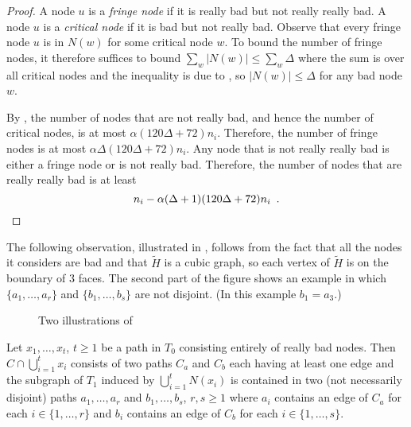 \documentclass{patmorin}
\begin{document}
\begin{proof}
    A node $u$ is a \emph{fringe node} if it is really bad but not really really bad. A node $u$ is a \emph{critical node} if it is bad but not really bad.  Observe that every fringe node $u$ is in $N(w)$ for some critical node $w$.  To bound the number of fringe nodes, it therefore suffices to bound $\sum_{w}|N(w)|\le\sum_{w}\Delta$ where the sum is over all critical nodes and the inequality is due to , so $|N(w)|\le\Delta$ for any bad node $w$.

    By , the number of nodes that are not really bad, and hence the number of critical nodes, is at most $\alpha(120\Delta+72) n_i$.  Therefore, the number of fringe nodes is at most $\alpha\Delta(120\Delta+72) n_i$.
    Any node that is not really really bad is either a fringe node or is not really bad.  Therefore, the number of nodes that are really really bad is at least
    \[
        n_i - \alpha(\Delta+1)(120\Delta+72) n_i \enspace . \qedhere
    \]
\end{proof}

The following observation, illustrated in , follows from the fact that all the nodes it considers are bad and that $\tilde{H}$ is a cubic graph, so each vertex of $\tilde{H}$ is on the boundary of 3 faces. The second part of the figure shows an example in which $\{a_1,\ldots,a_r\}$ and $\{b_1,\ldots,b_s\}$ are not disjoint. (In this example $b_1=a_3$.)

\begin{figure}
    \caption{Two illustrations of }
\end{figure}


\begin{obs}
    Let $x_1,\ldots,x_t$, $t\ge 1$ be a path in $T_0$ consisting entirely of really bad nodes.  Then $C\cap\bigcup_{i=1}^t x_i$ consists of two paths $C_a$ and $C_b$ each having at least one edge and the subgraph of $T_1$ induced by $\bigcup_{i=1}^t N(x_i)$ is contained in two (not necessarily disjoint) paths $a_1,\ldots,a_r$ and $b_1,\ldots,b_s$, $r,s\ge 1$ where $a_i$ contains an edge of $C_a$ for each $i\in\{1,\ldots,r\}$ and $b_i$ contains an edge of $C_b$ for each $i\in\{1,\ldots,s\}$.
\end{obs}
\end{document}
